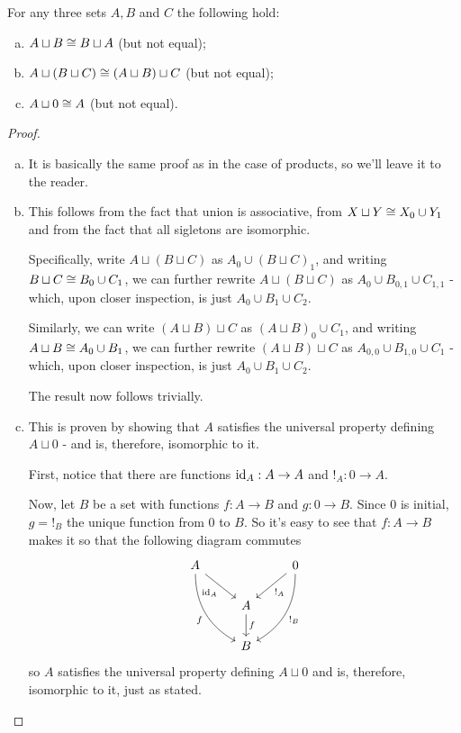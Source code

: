 \begin{lemma}
	For any three sets $A,B$ and $C$ the following hold:
	\begin{enumerate}[(a)]
		\item $A\sqcup B\cong B\sqcup A$ (but not equal);
		\item $A\sqcup(B\sqcup C)\cong (A\sqcup B)\sqcup C$ (but not equal);
		\item $A\sqcup 0\cong A$ (but not equal).
	\end{enumerate}
\end{lemma}
\begin{proof}
	\begin{enumerate}[(a)]
		\item It is basically the same proof as in the case of products, so we'll leave it to the reader.
		
		\item This follows from the fact that union is associative, from $X\sqcup Y\cong X_0\cup Y_1$ and from the fact that all sigletons are isomorphic.
		
		Specifically, write $A\sqcup(B\sqcup C)$ as $A_0\cup(B\sqcup C)_1$, and writing $B\sqcup C\cong B_0\cup C_1$, we can further rewrite $A\sqcup(B\sqcup C)$ as $A_0\cup B_{0,1}\cup C_{1,1}$ - which, upon closer inspection, is just $A_0\cup B_1\cup C_2$.
		
		Similarly, we can write $(A\sqcup B)\sqcup C$ as $(A\sqcup B)_0\cup C_1$, and writing $A\sqcup B\cong A_0\cup B_1$, we can further rewrite $(A\sqcup B)\sqcup C$ as $A_{0,0}\cup B_{1,0}\cup C_1$ - which, upon closer inspection, is just $A_0\cup B_1\cup C_2$.
		
		The result now follows trivially.
		
		\item This is proven by showing that $A$ satisfies the universal property defining $A\sqcup 0$ - and is, therefore, isomorphic to it.
		
		First, notice that there are functions ${\rm id}_A:A\to A$ and $!_A:0\to A$.
		
		Now, let $B$ be a set with functions $f:A\to B$ and $g:0\to B$. Since $0$ is initial, $g=!_B$ the unique function from $0$ to $B$. So it's easy to see that $f:A\to B$ makes it so that the following diagram commutes
		\[\begin{tikzcd}
		A \arrow[rdd, "f"', bend right] \arrow[rd, "\id_A"'] &                  & 0 \arrow[ldd, "!_B", bend left] \arrow[ld, "!_A"] \\
		& A \arrow[d, "f"] &                                                   \\
		& B                &                                                  
		\end{tikzcd}\]so $A$ satisfies the universal property defining $A\sqcup 0$ and is, therefore, isomorphic to it, just as stated.
		

\end{enumerate}
\end{proof}
